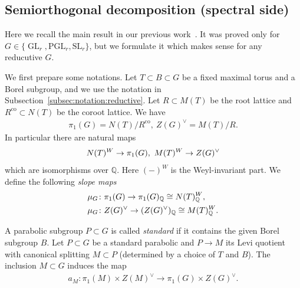 \documentclass [11pt,oneside,a4paper,mathscr]{amsart}
\theoremstyle{definition}
\newcommand{\GL}{\operatorname{GL}}
\begin{document}
\subsection{Semiorthogonal decomposition (spectral side)}\label{subsec:SOD0}
Here we recall the main result in our previous work~\cite{PThiggs}. It was proved 
only for $G \in \{\GL_r, \mathrm{PGL}_r, \mathrm{SL}_r\}$, but we formulate it 
which makes sense for any reducutive $G$. 

We first prepare some notations. 
Let $T \subset B\subset G$ be a fixed maximal torus and a Borel subgroup, and 
we use the notation in Subsection~\ref{subsec:notation:reductive}.
Let $R\subset M(T)$ be the root lattice and $R^{\mathrm{co}}\subset N(T)$ be the coroot lattice. 
We have 
\begin{align*}
    \pi_1(G)=N(T)/R^{\mathrm{co}}, \ Z(G)^{\vee}=M(T)/R. 
\end{align*}
In particular there are natural maps 
\begin{align}\notag
    N(T)^W \to \pi_1(G), \ M(T)^W \to Z(G)^{\vee}
\end{align}
which are isomorphisms over $\mathbb{Q}$. Here $(-)^W$ is the Weyl-invariant part. 
We define the following \textit{slope maps}
\begin{align}\label{def:slopemaps}
   & \mu_G \colon \pi_1(G) \to \pi_1(G)_{\mathbb{Q}}
  \notag  \cong N(T)_{\mathbb{Q}}^W, \\
   & \mu_G \colon Z(G)^{\vee} \to (Z(G)^{\vee})_{\mathbb{Q}} \cong M(T)_{\mathbb{Q}}^W.
\end{align}

A parabolic subgroup $P \subset G$ is called \textit{standard} if it contains the given Borel 
subgroup $B$. Let $P\subset G$ be a standard parabolic and $P\to M$ its Levi quotient
with canonical splitting $M\subset P$ (determined by a choice of $T$ and $B$). 
The inclusion $M\subset G$ induces 
the map 
\begin{align}\label{def:aM}
    a_{M} \colon \pi_1(M)\times Z(M)^{\vee} \to 
    \pi_1(G) \times Z(G)^{\vee}. 
\end{align}
\end{document}

